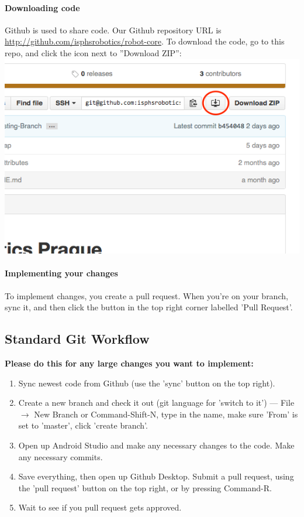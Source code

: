 \documentclass[12p,a4paper]{article}
\begin{document}
\paragraph{Downloading code}Github is used to share code. Our Github repository URL is \url{http://github.com/isphsrobotics/robot-core}. To download the code, go to this repo, and click the icon next to ''Download ZIP'':\\
\includegraphics[scale=0.6]{download-repo}
\paragraph{Implementing your changes}To implement changes, you create a pull request. When you're on your branch, sync it, and then click the button in the top right corner labelled 'Pull Request'.
\pagebreak
\subsection{Standard Git Workflow}
\textbf{Please do this for any large changes you want to implement:}

\begin{enumerate}
\item{Sync newest code from Github (use the 'sync' button on the top right).}
\item{Create a new branch and check it out (git language for 'switch to it') --- File $\rightarrow$ New Branch or Command-Shift-N, type in the name, make sure 'From' is set to 'master', click 'create branch'.}
\item{Open up Android Studio and make any necessary changes to the code. Make any necessary commits.}
\item{Save everything, then open up Github Desktop. Submit a pull request, using the 'pull request' button on the top right, or by pressing Command-R.}
\item{Wait to see if you pull request gets approved.}
\end{enumerate}
\end{document}
